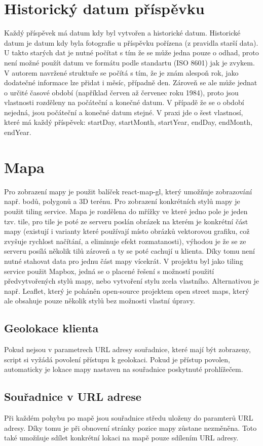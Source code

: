 \documentclass[12pt, a4paper,
 twoside,        %
 openright
]{report}
\begin{document}
\section{Historický datum příspěvku}\label{section:historica_date}
Každý příspěvek má datum kdy byl vytvořen a historické datum. Historické datum je datum kdy byla fotografie u příspěvku pořízena (z pravidla starší data). U takto starých dat je nutné počítat s tím že se může jedna pouze o odhad, proto není možné použít datum ve formátu podle standartu (ISO 8601) jak je zvykem. V autorem navržené struktuře se počítá s tím, že je znám alespoň rok, jako dodatečné informace lze přidat i měsíc, případně den. Zároveň se ale může jednat o určité časové období (například červen až červenec roku 1984), proto jsou vlastnosti rozděleny na počáteční a konečné datum. V případě že se o období nejedná, jsou počáteční a konečné datum stejné. V praxi jde o šest vlastnosí, které má každý příspěvek: startDay, startMonth, startYear, endDay, endMonth, endYear.

\section{Mapa}
    Pro zobrazení mapy je použit balíček react-map-gl, který umožňuje zobrazování např. bodů, polygonů a 3D terénu. Pro zobrazení konkrétních stylů mapy je použit tiling service. Mapa je rozdělena do mřížky ve které jedno pole je jeden tzv. tile, pro tile je poté ze serveru poslán obrázek na kterém je konkrétní část mapy (existují i varianty které používají místo obrázků vektorovou grafiku, což zvyšuje rychlost načítání, a eliminuje efekt rozmatanosti), výhodou je že se ze serveru posílá několik tilů zároveň a ty se poté cachují u klienta. Díky tomu není nutné stahovat data pro jednu část mapy vícekrát. V projektu byl jako tiling service použit Mapbox, jedná se o placené řešení s možností použití předvytvořených stylů mapy, nebo vytvoření stylu zcela vlastního. Alternativou je např. Leaflet, který je poháněn open-source projektem open street maps, který ale obsahuje pouze několik stylů bez možnosti vlastní úpravy.
    \subsection{Geolokace klienta} Pokud nejsou v parametrech URL adresy souřadnice, které mají být zobrazeny, script si vyžádá povolení přístupu k geolokaci. Pokud je přístup povolen, automaticky je lokace mapy nastaven na souřadnice poskytnuté prohlížečem.
    \subsection{Souřadnice v URL adrese}
    Při každém pohybu po mapě jsou souřadnice středu uloženy do paramterů URL adresy. Díky tomu je při obnovení stránky pozice mapy zůstane nezměněna. Toto také umožňuje sdílet konkrétní lokaci na mapě pouze sdílením URL adresy.
\end{document}
